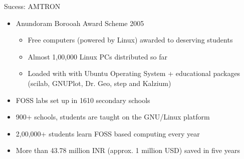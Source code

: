\documentclass{beamer}
\begin{document}
\begin{frame}{Sucess: AMTRON}
  \begin {itemize}
      \item Anundoram Borooah Award Scheme 2005
          \begin {itemize}
             \item Free computers (powered by Linux) awarded to deserving students
              \item Almost 1,00,000 Linux PCs distributed so far 
              \item Loaded with with Ubuntu Operating System + educational packages (scilab, GNUPlot, Dr. Geo, step and Kalzium)
           \end{itemize}
       \item FOSS labs set up in 1610 secondary schools
       \item  900+ schools, students  are taught on the GNU/Linux platform
        \item 2,00,000+ students learn FOSS based computing every year
        \item More than 43.78 million INR (approx. 1 million USD) saved in five years
   \end{itemize}
\end{frame}
\end{document}
